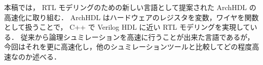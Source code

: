 本稿では， RTL モデリングのための新しい言語として提案された ArchHDL の高速化に取り組む．
ArchHDL はハードウェアのレジスタを変数，ワイヤを関数として扱うことで， C++ で Verilog HDL に近い
RTL モデリングを実現している．
従来から論理シュミレーションを高速に行うことが出来た言語であるが，今回はそれを更に高速化し，他のシュミレーションツールと比較してどの程度高速なのか述べる．